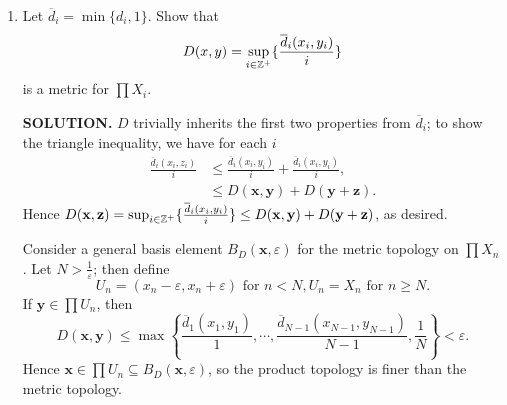 \documentclass{article}
\begin{document}
\begin{enumerate}
\begin{enumerate}
        {\bf SOLUTION.} The first two conditions are trivially inherited from the metrics $d_i$; to show the triangle inequality,
        \begin{align*}
            \rho(x, y) + \rho(y, z) &= \max \{d_1(x_1,y_1), \cdots, d_n(x_n, y_n)\} + \max \{d_1(y_1,z_1), \cdots, d_n(y_n, z_n)\}, \\
            &\geq \max \{d_1(x_1,y_1) + d(y_1, z_1), \cdots, d_n(x_n, y_n) + d_n(y_n, z_n)\}, \\
            &\geq \max \{d_1(x_1,z_1), \cdots, d_n(x_n, z_n)\}, \\
            &= \rho(x, z).
        \end{align*}
        To show that $\rho$ induces the product topology, consider a basis element $B_{d_1}(x_1, \varepsilon_1) \times \cdots \times B_{d_n}(x_n, \varepsilon_n)$ for the product topology. Let $\varepsilon = \min \{\varepsilon_1, \cdots, \varepsilon_n\}$; then clearly
        $$B_\rho(\mathbf{x}, \varepsilon) \subseteq B_{d_1}(x_1, \varepsilon_1) \times \cdots \times B_{d_n}(x_n, \varepsilon_n),$$
        so the metric topology is finer than the product topology. Conversely, consider a basis element $B_\rho(\mathbf{x}, \varepsilon)$ for the metric topology.
        $$B_{d_1} (x_1, \varepsilon) \times \cdots \times B_{d_n}(x_n, \varepsilon) \subseteq B_\rho(\mathbf{x}, \varepsilon),$$
        so the product topology is finer than the metric topology. $\Box$

        \item Let $\overline{d}_i = \min \{d_i, 1\}$. Show that
        $$D(x, y) = \sup_{i \in \mathbb{Z}^+} \{\frac{\overline{d}_i(x_i, y_i)}{i}\}$$
        is a metric for $\prod X_i$.

        {\bf SOLUTION.} $D$ trivially inherits the first two properties from $\overline{d}_i$; to show the triangle inequality, we have for each $i$
        \begin{align*}
            \frac{\overline{d}_i(x_i, z_i)}{i} &\leq \frac{\overline{d}_i(x_i, y_i)}{i} + \frac{\overline{d}_i(x_i, y_i)}{i}, \\
            &\leq D(\mathbf{x}, \mathbf{y}) + D(\mathbf{y} + \mathbf{z}).
        \end{align*}
        Hence $D(\mathbf{x}, \mathbf{z}) = \sup_{i \in \mathbb{Z}^+} \{\frac{\overline{d}_i(x_i, y_i)}{i}\} \leq D(\mathbf{x}, \mathbf{y}) + D(\mathbf{y} + \mathbf{z})$, as desired.

        Consider a general basis element $B_D(\mathbf{x}, \varepsilon)$ for the metric topology on $\prod X_n$. Let $N > \frac{1}{\varepsilon}$; then define
        $$U_n = (x_n - \varepsilon, x_n + \varepsilon) \text{ for } n < N, U_n = X_n \text{ for } n \geq N.$$
        If $\mathbf{y} \in \prod U_n$, then
        $$D(\mathbf{x}, \mathbf{y}) \leq \max \left\{ \frac{\overline{d}_1(x_1, y_1)}{1}, \cdots, \frac{\overline{d}_{N-1}(x_{N-1}, y_{N-1})}{N-1}, \frac1N \right\} < \varepsilon.$$
        Hence $\mathbf{x} \in \prod U_n \subseteq B_D(\mathbf{x}, \varepsilon)$, so the product topology is finer than the metric topology.


\end{enumerate}
\end{enumerate}
\end{document}
